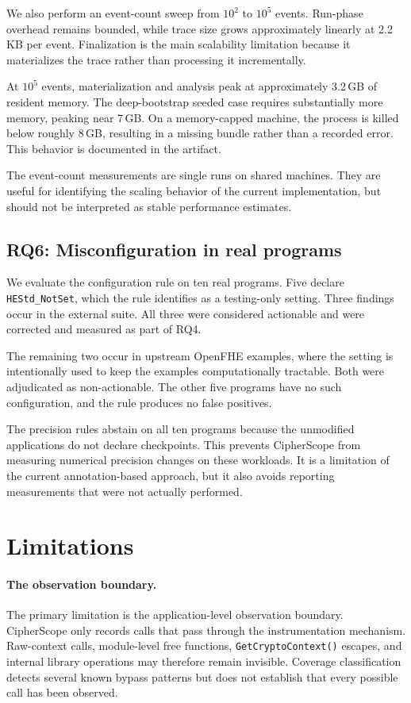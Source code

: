 \documentclass[pdflatex,sn-basic,Numbered,iicol]{sn-jnl}
\begin{document}
We also perform an event-count sweep from $10^2$ to $10^5$ events. Run-phase
overhead remains bounded, while trace size grows approximately linearly at
2.2\,KB per event. Finalization is the main scalability limitation because it
materializes the trace rather than processing it incrementally.

At $10^5$ events, materialization and analysis peak at approximately
3.2\,GB of resident memory. The deep-bootstrap seeded case requires
substantially more memory, peaking near 7\,GB. On a memory-capped machine,
the process is killed below roughly 8\,GB, resulting in a missing bundle
rather than a recorded error. This behavior is documented in the artifact.

The event-count measurements are single runs on shared machines. They are
useful for identifying the scaling behavior of the current implementation,
but should not be interpreted as stable performance estimates.

\subsection{RQ6: Misconfiguration in real programs}
\label{sec:rq6}

We evaluate the configuration rule on ten real programs. Five declare
\texttt{HEStd\_NotSet}, which the rule identifies as a testing-only setting.
Three findings occur in the external suite. All three were considered
actionable and were corrected and measured as part of RQ4.

The remaining two occur in upstream OpenFHE examples, where the setting is
intentionally used to keep the examples computationally tractable. Both were
adjudicated as non-actionable. The other five programs have no such
configuration, and the rule produces no false positives.

The precision rules abstain on all ten programs because the unmodified
applications do not declare checkpoints. This prevents CipherScope from
measuring numerical precision changes on these workloads. It is a limitation
of the current annotation-based approach, but it also avoids reporting
measurements that were not actually performed.

\section{Limitations}
\label{sec:limits}

\paragraph{The observation boundary.} The primary limitation is the
application-level observation boundary. CipherScope only records calls that
pass through the instrumentation mechanism. Raw-context calls, module-level
free functions, \texttt{GetCryptoContext()} escapes, and internal library
operations may therefore remain invisible. Coverage classification detects
several known bypass patterns but does not establish that every possible call
has been observed.
\end{document}
